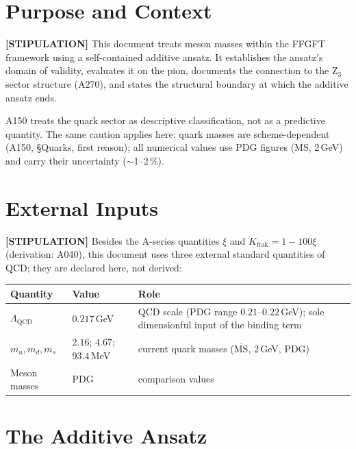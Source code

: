 
\section{Purpose and Context}

\textbf{[STIPULATION]} This document treats meson masses within the
FFGFT framework using a self-contained additive ansatz. It establishes
the ansatz's domain of validity, evaluates it on the pion, documents
the connection to the Z$_3$ sector structure (A270), and states the
structural boundary at which the additive ansatz ends.

A150 treats the quark sector as descriptive classification, not as a
predictive quantity. The same caution applies here: quark masses are
scheme-dependent (A150, \S{}Quarks, first reason); all numerical values
use PDG figures ($\overline{\text{MS}}$, 2\,GeV) and carry their
uncertainty ($\sim$1--2\,\%).

\section{External Inputs}

\textbf{[STIPULATION]} Besides the A-series quantities $\xi$ and
$K_\text{frak} = 1-100\xi$ (derivation: A040), this document uses three
external standard quantities of QCD; they are declared here, not
derived:

\begin{center}
\renewcommand{\arraystretch}{1.3}
{\small\begin{tabular}{llp{6cm}}
\toprule
Quantity & Value & Role \\
\midrule
$\Lambda_\text{QCD}$ & $0{.}217$\,GeV & QCD scale (PDG range
$0{.}21$--$0{.}22$\,GeV); sole dimensionful input of the binding term \\
$m_u, m_d, m_s$ & $2{.}16$; $4{.}67$; $93{.}4$\,MeV &
current quark masses ($\overline{\text{MS}}$, 2\,GeV, PDG) \\
Meson masses & PDG & comparison values \\
\bottomrule
\end{tabular}}
\renewcommand{\arraystretch}{1.0}
\end{center}

\section{The Additive Ansatz}

